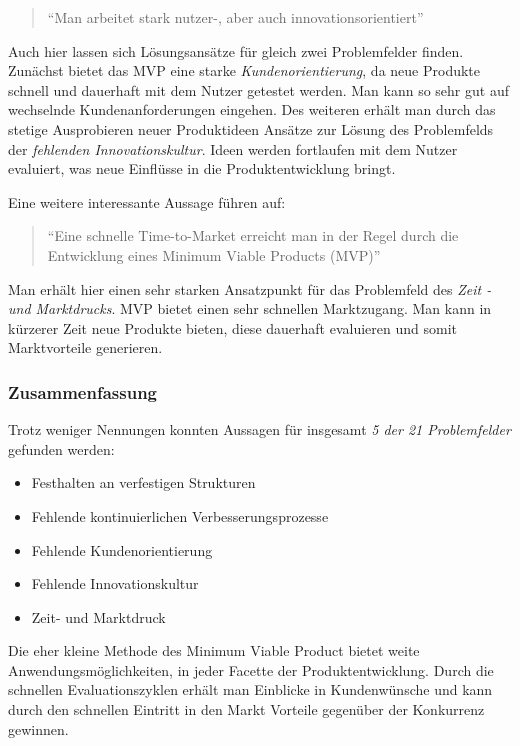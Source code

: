 \begin{quote}
	``Man arbeitet stark  nutzer-, aber auch innovationsorientiert'' \cite[S. 13]{chanias_digital_2018}
\end{quote}

Auch hier lassen sich Lösungsansätze für gleich zwei Problemfelder finden. Zunächst bietet das MVP eine starke \textit{Kundenorientierung}, da neue Produkte schnell und dauerhaft mit dem Nutzer getestet werden. Man kann so sehr gut auf wechselnde Kundenanforderungen eingehen. Des weiteren erhält man durch das stetige Ausprobieren neuer Produktideen Ansätze zur Lösung des Problemfelds der \textit{fehlenden Innovationskultur}. Ideen werden fortlaufen mit dem Nutzer evaluiert, was neue Einflüsse in die Produktentwicklung bringt.

Eine weitere interessante Aussage führen  auf:

\begin{quote}
	``Eine schnelle Time-to-Market erreicht man in der Regel durch die Entwicklung eines Minimum Viable Products (MVP)'' \cite[S. 213]{gassmann_digitale_2016}
\end{quote}

Man erhält hier einen sehr starken Ansatzpunkt für das Problemfeld des \textit{Zeit - und Marktdrucks}. MVP bietet einen sehr schnellen Marktzugang. Man kann in kürzerer Zeit neue Produkte bieten, diese dauerhaft evaluieren und somit Marktvorteile generieren.

\subsubsection{Zusammenfassung}

Trotz weniger Nennungen konnten Aussagen für insgesamt \textit{5 der 21 Problemfelder} gefunden werden:

 \begin{itemize}[noitemsep, topsep=0pt]
	\item Festhalten an verfestigen Strukturen
	\item Fehlende kontinuierlichen Verbesserungsprozesse
	\item Fehlende Kundenorientierung
	\item Fehlende Innovationskultur
	\item Zeit- und Marktdruck
\end{itemize}

Die eher kleine Methode des Minimum Viable Product bietet weite Anwendungsmöglichkeiten, in jeder Facette der Produktentwicklung. Durch die schnellen Evaluationszyklen erhält man Einblicke in Kundenwünsche und kann durch den schnellen Eintritt in den Markt Vorteile gegenüber der Konkurrenz gewinnen.

